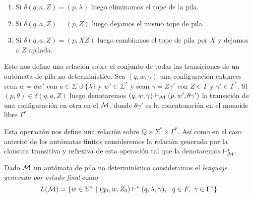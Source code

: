 \documentclass[tesis.tex]{subfiles}
\begin{document}
\begin{enumerate}
	\item Si $\delta(q,a,Z) = (p,\lambda)$ luego eliminamos el tope de la pila.
	\item Si $\delta(q,a,Z) =  (p,Z)$ luego dejamos el mismo tope de pila.
	\item Si $\delta(q,a,Z) = (p, XZ)$ luego cambiamos el tope de pila por $X$ y dejamos a $Z$ apilada.
\end{enumerate}


Esto nos define una relación sobre el conjunto de todas las transiciones de un autómata de pila no determinístico.
Sea $(q,w,\gamma)$ una configuración entonces sean $w = aw'$ con $a \in \Sigma \cup \{ \lambda \}$ y $w' \in \Sigma^*$  y sean $\gamma = Z\gamma'$ con $Z \in \Gamma$ y $\gamma' \in \Gamma^{*}$.
Si $(p,\theta) \in \delta (q,a,Z)$  luego denotaremos $(q,w,\gamma) \vdash_{\cal M} (p,w',\theta\gamma')$ la transición de una configuración en otra en el \APND $\cal M$,
donde $\theta \gamma'$ es la concatenación en el monoide libre $\Gamma^{*}$. 

Esta operación nos define una relación sobre $Q \times \Sigma^* \times \Gamma^*$.
Así como en el caso anterior de los autómatas finitos consideremos la relación generada por la clausura transitiva y reflexiva de esta operación tal que la denotaremos $\vdash^*_{\cal M}$.


\begin{deff}
	Dado $\cal M$ un autómata de pila no determinístico consideramos el \emph{lenguaje generado por estado final} como
	\begin{equation*}
		L( {\cal M}) = \{ w \in \Sigma^* \ | \ (q_0,w,Z_0) \vdash^* (q, \lambda, \gamma), \ \ q \in F, \ \gamma \in \Gamma^*      \}
	\end{equation*}
\end{deff}
\end{document}
